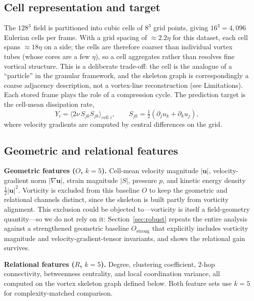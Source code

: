 \documentclass[11pt,a4paper]{article}
\begin{document}
\subsection{Cell representation and target}
The $128^3$ field is partitioned into cubic cells of $8^3$ grid points, giving $16^3 = 4{,}096$ Eulerian cells per frame. With a grid spacing of $\approx 2.2\eta$ for this dataset, each cell spans $\approx 18\eta$ on a side; the cells are therefore coarser than individual vortex tubes (whose cores are a few $\eta$), so a cell aggregates rather than resolves fine vortical structure. This is a deliberate trade-off: the cell is the analogue of a ``particle'' in the granular framework, and the skeleton graph is correspondingly a coarse adjacency description, not a vortex-line reconstruction (see Limitations). Each stored frame plays the role of a compression cycle. The prediction target is the cell-mean dissipation rate,
\begin{equation}
Y_i = \langle 2\nu\, S_{jk} S_{jk} \rangle_{\text{cell } i},
\qquad S_{jk} = \tfrac{1}{2}(\partial_j u_k + \partial_k u_j),
\end{equation}
where velocity gradients are computed by central differences on the grid.

\subsection{Geometric and relational features}
\textbf{Geometric features ($O$, $k=5$).} Cell-mean velocity magnitude $|\mathbf{u}|$, velocity-gradient norm $|\nabla\mathbf{u}|$, strain magnitude $|S|$, pressure $p$, and kinetic energy density $\tfrac{1}{2}|\mathbf{u}|^2$. Vorticity is excluded from this baseline $O$ to keep the geometric and relational channels distinct, since the skeleton is built partly from vorticity alignment. This exclusion could be objected to---vorticity is itself a field-geometry quantity---so we do not rely on it: Section~\ref{sec:robust} repeats the entire analysis against a strengthened geometric baseline $O_{\text{strong}}$ that explicitly includes vorticity magnitude and velocity-gradient-tensor invariants, and shows the relational gain survives.

\textbf{Relational features ($R$, $k=5$).} Degree, clustering coefficient, 2-hop connectivity, betweenness centrality, and local coordination variance, all computed on the vortex skeleton graph defined below. Both feature sets use $k=5$ for complexity-matched comparison.
\end{document}

